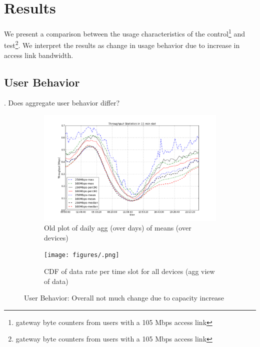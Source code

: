 \section{Results}
\label{sec:results}


We present a comparison between the usage characteristics of the control\footnote{gateway byte counters from users with a 105 Mbps access link} and test\footnote{gateway byte counters from users with a 105 Mbps access link}. We interpret the results as change in usage behavior due to increase in access link bandwidth. %

\subsection{User Behavior}
\label{subsec:behavior}

. Does aggregate user behavior differ?

\begin{figure}[t!]
\begin{minipage}{1\linewidth}
\centering
%
\begin{subfigure}[b]{0.5\linewidth}
\includegraphics[width=\linewidth]{figures/describe-total-throughput-per-day[replace].png}
  \caption{Old plot of daily agg (over days) of means (over devices)}
  \label{fig:TS-data-rate-daily}
\end{subfigure}
%
\hspace{-1em}
%
\begin{subfigure}[b]{0.5\linewidth}
\texttt{[image: figures/.png]}
  \caption{CDF of data rate per time slot for all devices (agg view of data)}
  \label{fig:CDF-data-rate-all}
\end{subfigure}
%
\end{minipage}
\caption{User Behavior: Overall not much change due to capacity increase}
\label{fig:user-behavior}
\end{figure}


